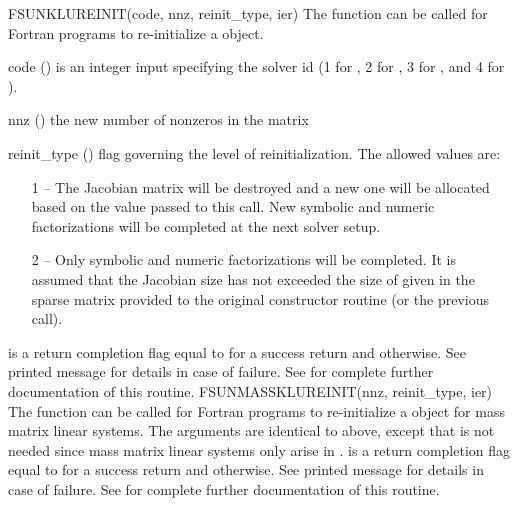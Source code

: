 %
{
  FSUNKLUREINIT(code, nnz, reinit\_type, ier)
}
{
  The function  can be called for Fortran programs
  to re-initialize a {\sunlinsolklu} object.
}
{
  \begin{args}
  \item[code] ()
    is an integer input specifying the solver id (1 for {\cvode}, 2
    for {\ida}, 3 for {\kinsol}, and 4 for {\arkode}).
  \item[nnz] ()
    the new number of nonzeros in the matrix
  \item[reinit\_type] ()
    flag governing the level of reinitialization.  The allowed values
    are:
    \begin{itemize}
    \item[1] -- The Jacobian matrix will be
      destroyed and a new one will be allocated based on the 
      value passed to this call.  New symbolic and numeric
      factorizations will be completed at the next solver setup.
    \item[2] -- Only symbolic and numeric
      factorizations will be completed.  It is assumed that the
      Jacobian size has not exceeded the size of  given in the
      sparse matrix provided to the original constructor routine (or
      the previous  call).
    \end{itemize}
  \end{args}
}
{
   is a  return completion flag equal to  for a success
  return and  otherwise. See printed message for details in case
  of failure.
}
{
  See  for complete further documentation of
  this routine.
}
%
%
{
  FSUNMASSKLUREINIT(nnz, reinit\_type, ier)
}
{
  The function  can be called for Fortran programs
  to re-initialize a {\sunlinsolklu} object for mass matrix linear systems.
}
{
  The arguments are identical to  above, except that
   is not needed since mass matrix linear systems only arise
  in {\arkode}.
}
{
   is a  return completion flag equal to  for a success
  return and  otherwise. See printed message for details in case
  of failure.
}
{
  See  for complete further documentation of
  this routine.
}
%
%

